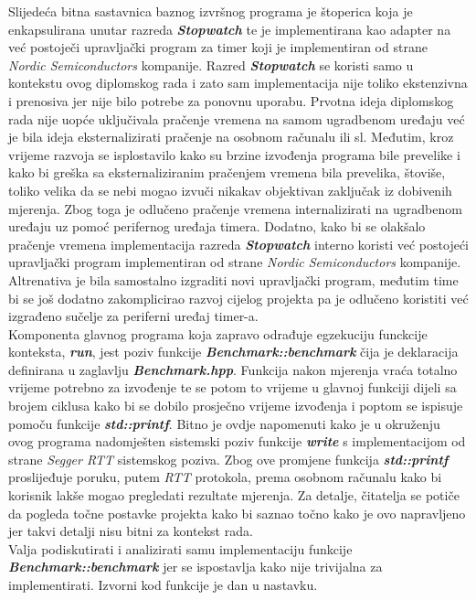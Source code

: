 Slijedeća bitna sastavnica baznog izvršnog programa je štoperica koja je enkapsulirana unutar razreda \textbf{\textit{Stopwatch}} te je implementirana kao adapter na već postoječi upravljački program za timer koji je implementiran od strane \textit{Nordic Semiconductors} kompanije. Razred \textbf{\textit{Stopwatch}} se koristi samo u kontekstu ovog diplomskog rada i zato sam implementacija nije toliko ekstenzivna i prenosiva jer nije bilo potrebe za ponovnu uporabu. Prvotna ideja diplomskog rada nije uopće uključivala pračenje vremena na samom ugradbenom uređaju već je bila ideja eksternalizirati pračenje na osobnom računalu ili sl. Međutim, kroz vrijeme razvoja se isplostavilo kako su brzine izvođenja programa bile prevelike i kako bi greška sa eksternaliziranim pračenjem vremena bila prevelika, štoviše, toliko velika da se nebi mogao izvuči nikakav objektivan zaključak iz dobivenih mjerenja. Zbog toga je odlučeno pračenje vremena internalizirati na ugradbenom uređaju uz pomoć perifernog uređaja timera. Dodatno, kako bi se olakšalo pračenje vremena implementacija razreda \textbf{\textit{Stopwatch}} interno koristi već postojeći upravljački program implementiran od strane \textit{Nordic Semiconductors} kompanije. Altrenativa je bila samostalno izgraditi novi upravljački program, međutim time bi se još dodatno zakomplicirao razvoj cijelog projekta pa je odlučeno koristiti već izgrađeno sučelje za periferni uređaj timer-a.\\
Komponenta glavnog programa koja zapravo odrađuje egzekuciju funckcije konteksta, \textbf{\textit{run}}, jest poziv funkcije \textbf{\textit{Benchmark::benchmark}} čija je deklaracija definirana u zaglavlju \textbf{\textit{Benchmark.hpp}}. Funkcija nakon mjerenja vraća totalno vrijeme potrebno za izvođenje te se potom to vrijeme u glavnoj funkciji dijeli sa brojem ciklusa kako bi se dobilo prosječno vrijeme izvođenja i poptom se ispisuje pomoču funkcije \textbf{\textit{std::printf}}. Bitno je ovdje napomenuti kako je u okruženju ovog programa nadomješten sistemski poziv funkcije \textbf{\textit{write}} s implementacijom od strane \textit{Segger RTT} sistemskog poziva. Zbog ove promjene funkcija \textbf{\textit{std::printf}} proslijeđuje poruku, putem \textit{RTT} protokola, prema osobnom računalu kako bi korisnik lakše mogao pregledati rezultate mjerenja. Za detalje, čitatelja se potiče da pogleda točne postavke projekta kako bi saznao točno kako je ovo napravljeno jer takvi detalji nisu bitni za kontekst rada. \\
Valja podiskutirati i analizirati samu implementaciju funkcije \textbf{\textit{Benchmark::benchmark}} jer se ispostavlja kako nije trivijalna za implementirati. Izvorni kod funkcije je dan u nastavku.
